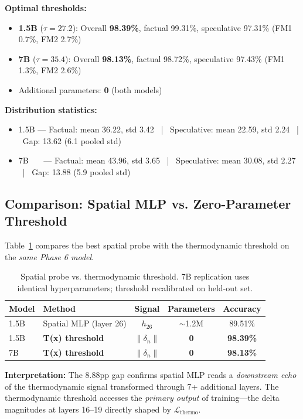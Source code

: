 \documentclass[11pt,a4paper]{article}
\begin{document}
\textbf{Optimal thresholds:}
\begin{itemize}
\item \textbf{1.5B} ($\tau = 27.2$): Overall \textbf{98.39\%}, factual 99.31\%, speculative 97.31\% (FM1 0.7\%, FM2 2.7\%)
\item \textbf{7B} ($\tau = 35.4$): Overall \textbf{98.13\%}, factual 98.72\%, speculative 97.43\% (FM1 1.3\%, FM2 2.6\%)
\item Additional parameters: \textbf{0} (both models)
\end{itemize}

\textbf{Distribution statistics:}
\begin{itemize}
\item 1.5B --- Factual: mean 36.22, std 3.42 \ | \ Speculative: mean 22.59, std 2.24 \ | \ Gap: 13.62 (6.1 pooled std)
\item 7B \ \ \ --- Factual: mean 43.96, std 3.65 \ | \ Speculative: mean 30.08, std 2.27 \ | \ Gap: 13.88 (5.9 pooled std)
\end{itemize}

\subsection{Comparison: Spatial MLP vs. Zero-Parameter Threshold}

Table~\ref{tab:comparison} compares the best spatial probe with the thermodynamic threshold on the \emph{same Phase 6 model}.

\begin{table}[h]
\centering
\caption{Spatial probe vs. thermodynamic threshold. 7B replication uses identical hyperparameters; threshold recalibrated on held-out set.}
\label{tab:comparison}
\begin{tabular}{llccc}
\toprule
Model & Method & Signal & Parameters & Accuracy \\
\midrule
1.5B & Spatial MLP (layer 26) & $h_{26}$ & $\sim$1.2M & 89.51\% \\
1.5B & \textbf{T(x) threshold} & $\|\delta_n\|$ & \textbf{0} & \textbf{98.39\%} \\
\midrule
7B & \textbf{T(x) threshold} & $\|\delta_n\|$ & \textbf{0} & \textbf{98.13\%} \\
\bottomrule
\end{tabular}
\end{table}

\textbf{Interpretation:} The 8.88pp gap confirms spatial MLP reads a \emph{downstream echo} of the thermodynamic signal transformed through 7+ additional layers. The thermodynamic threshold accesses the \emph{primary output} of training---the delta magnitudes at layers 16--19 directly shaped by $\mathcal{L}_\text{thermo}$.
\end{document}

